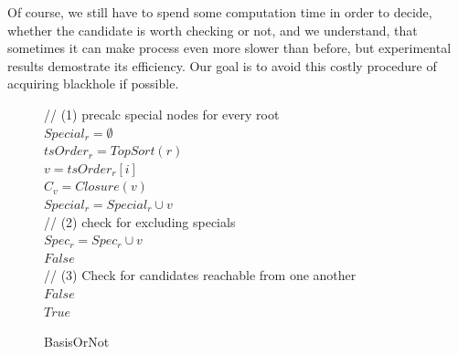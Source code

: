 \documentclass{svproc}
\begin{document}
\begin{remark}
Of course, we still have to spend some computation time in order to decide, whether
the candidate is worth checking or not, and we understand, that sometimes it can make process even more slower than before, but experimental results demostrate its efficiency.
Our goal is to avoid this costly procedure of acquiring blackhole if possible.
\end{remark}

\begin{figure}[H]
	\begin{center}
		\begin{algorithm}[H]
			\SetAlgoLined
                        // (1) precalc special nodes for every root \\
                         {
                            $Special_r = \emptyset$ \\
                            $tsOrder_r = TopSort(r)$ \\
                             {
                                $v = tsOrder_r[i]$ \\
                                $C_v = Closure(v)$ \\
                                 {
                                    $Special_r = Special_r \cup v$ \\
                                }
                            }
                        }
			// (2) check for excluding specials \\
			 {
                             {
                                 {
                                    $Spec_r = Spec_r \cup v$ \\
                                     {
                                        \Return $False$ \\
                                    }
                                }
                            }
			}
                        // (3) Check for candidates reachable from one another \\
                         {
                             {
                                \Return $False$ \\
                            }
                        }
                        \Return $True$
			\label{alg:isbasis}
			\caption{BasisOrNot}
		\end{algorithm}
	\end{center}
\end{figure}
\end{document}
